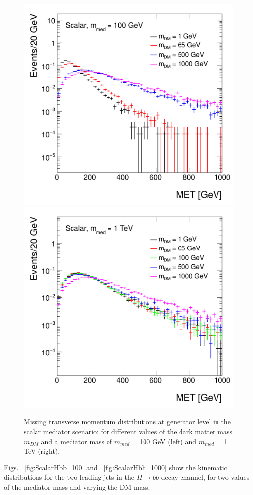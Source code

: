 \begin{figure}[hbpt!]
	\begin{center}
		\includegraphics[width=0.49\linewidth]{figures/EW/monoH/scalar_100_MET_et_Log}
		\includegraphics[width=0.49\linewidth]{figures/EW/monoH/scalar_1000_MET_et_Log}
		\caption{Missing transverse momentum distributions at generator level in the scalar 
			mediator scenario: for different values of the dark matter mass $m_{DM}$ 
			and a mediator mass of $m_{med}$ = 100 GeV (left) and $m_{med}$ = 1 TeV (right).
			\label{fig:metScalarMass}}
	\end{center}
\end{figure}

Figs. ~\ref{fig:ScalarHbb_100} and ~\ref{fig:ScalarHbb_1000} show the kinematic distributions for the two leading jets
in the $H \to \bar b b$ decay channel, for two values of the mediator mass and varying the DM mass.  

